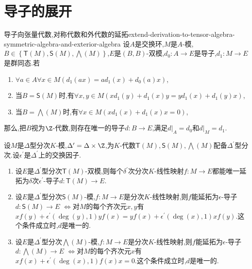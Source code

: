 \section{导子的展开}

\begin{proposition}{导子向张量代数,对称代数和外代数的延拓}{extend-derivation-to-tensor-algebra-symmetric-algebra-and-exterior-algebra}
	设$A$是交换环,$M$是$A$-模,$B\in\left\{\mathsf{T}\left(M\right),\mathsf{S}\left(M\right),\bigwedge\left(M\right)\right\}$,$E$是$\left(B,B\right)$-双模,$d_{0}:A\to E$是导子,$d_{1}:M\to E$是群同态.若
	\begin{enumerate}
		\item $\forall a\in A\forall x\in M\left(d_{1}\left(ax\right)=ad_{1}\left(x\right)+d_{0}\left(a\right)x\right)$,
		\item 当$B=\mathsf{S}\left(M\right)$时,有$\forall x,y\in M\left(xd_{1}\left(y\right)+d_{1}\left(x\right)y=yd_{1}\left(x\right)+d_{1}\left(y\right)x\right)$,
		\item 当$B=\bigwedge\left(M\right)$时,有$\forall x\in M\left(xd_{1}\left(x\right)+d_{1}\left(x\right)x=0\right)$,
	\end{enumerate}
	那么,把$B$视为$\Z$-代数,则存在唯一的导子$d:B\to E$,满足$d|_{A}=d_{0}$和$d|_{M}=d_{1}$.
\end{proposition}

\begin{corollary}{}{}
	设$M$是$\Delta$型分次$K$-模,$\Delta^{\prime}=\Delta\times\Z$,为$K$-代数$\mathsf{T}\left(M\right),\mathsf{S}\left(M\right),\bigwedge\left(M\right)$配备$\Delta^{\prime}$型分次.设$\epsilon^{\prime}$是$\Delta^{\prime}$上的交换因子.
	\begin{enumerate}
		\item 设$E$是$\Delta^{\prime}$型分次$\mathsf{T}\left(M\right)$-双模,则每个$\delta^{\prime}$次分次$K$-线性映射$f:M\to E$都能唯一延拓为$\delta$次$\epsilon^{\prime}$-导子$d:\mathsf{T}\left(M\right)\to E$.
		\item 设$E$是$\Delta^{\prime}$型分次$\mathsf{S}\left(M\right)$-模,$f:M\to E$是分次$K$-线性映射,则$f$能延拓为$\epsilon$-导子$d:\mathsf{S}\left(M\right)\to E$ $\iff$对$M$的每个齐次元$x,y$有$xf\left(y\right)+\epsilon^{\prime}\left(\deg\left(y\right),1\right)yf\left(x\right)=yf\left(x\right)+\epsilon^{\prime}\left(\deg\left(x\right),1\right)xf\left(y\right)$.这个条件成立时,$d$是唯一的.
		\item 设$E$是$\Delta^{\prime}$型分次$\bigwedge\left(M\right)$-模,$f:M\to E$是分次$K$-线性映射,则$f$能延拓为$\epsilon$-导子$d:\bigwedge\left(M\right)\to E$ $\iff$对$M$的每个齐次元$x$有$xf\left(x\right)+\epsilon^{\prime}\left(\deg\left(x\right),1\right)f\left(x\right)x=0$.这个条件成立时,$d$是唯一的.
	\end{enumerate}
\end{corollary}

